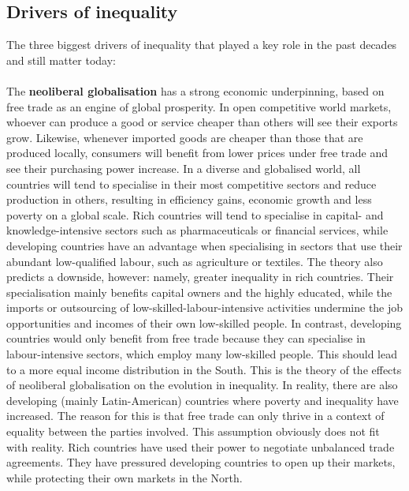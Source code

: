 \documentclass[../summary.tex]{subfiles}
\begin{document}
\subsection{Drivers of inequality}

The three biggest drivers of inequality that played a key role in the past decades and still matter today:
\\\\
The \textbf{neoliberal globalisation} has a strong economic underpinning, based on free trade as an engine of global prosperity. In open competitive world markets, whoever can produce a good or service cheaper than others will see their exports grow. Likewise, whenever imported goods are cheaper than those that are produced locally, consumers will benefit from lower prices under free trade and see their purchasing power increase. In a diverse and globalised world, all countries will tend to specialise in their most competitive sectors and reduce production in others, resulting in efficiency gains, economic growth and less poverty on a global scale. Rich countries will tend to specialise in capital- and knowledge-intensive sectors such as pharmaceuticals or financial services, while developing countries have an advantage when specialising in sectors that use their abundant low-qualified labour, such as agriculture or textiles. The theory also predicts a downside, however: namely, greater inequality in rich countries. Their specialisation mainly benefits capital owners and the highly educated, while the imports or outsourcing of low-skilled-labour-intensive activities undermine the job opportunities and incomes of their own low-skilled people. In contrast, developing countries would only benefit from free trade because they can specialise in labour-intensive sectors, which employ many low-skilled people. This should lead to a more equal income distribution in the South. This is the theory of the effects of neoliberal globalisation on the evolution in inequality. In reality, there are also developing (mainly Latin-American) countries where poverty and inequality have increased. The reason for this is that free trade can only thrive in a context of equality between the parties involved. This assumption obviously does not fit with reality. Rich countries have used their power to negotiate unbalanced trade agreements. They have pressured developing countries to open up their markets, while protecting their own markets in the North.
\\\\
\end{document}
